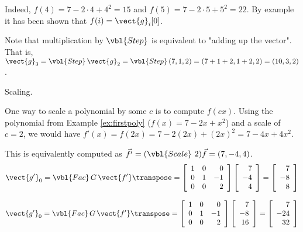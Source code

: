 Indeed, $f(4) = 7 - 2\cdot 4 + 4^2 = 15$ and $f(5) = 7 - 2\cdot 5 + 5^2 = 22$.
By example it has been shown that $f(i) = \vect{g}_i [0]$.

Note that multiplication by $\vbl{Step}$ is equivalent to "adding up the vector".
That is, $\vect{g}_3 = \vbl{Step}\,\vect{g}_2 = \vbl{Step}\,(7, 1, 2) = (7+1+2, 1+2, 2) = (10, 3, 2)$.

\begin{example}
 Scaling.
\end{example}

One way to scale a polynomial by some $c$ is to compute $f(cx)$.
Using the polynomial from Example \ref{ex:firstpoly} ($f(x)= 7 - 2x + x^2$) and a scale of $c=2$, we would have $f'(x) = f(2x) = 7 - 2 (2x) + (2x)^2 = 7 - 4x + 4x^2$.

This is equivalently computed as $\vec{f'} = (\vbl{Scale}\ 2) \vec{f} = (7, -4, 4)$.
\[
 \vect{g'}_0 =
 \vbl{Fac}\,G\,\vect{f'} \transpose =
 \left[\begin{array}{rrr}
   1 & 0 &  0 \\
   0 & 1 & -1 \\
   0 & 0 &  2 \\
 \end{array}\right]
 \left[\begin{array}{r}
   7 \\ -4 \\ 4 \\
 \end{array}\right]
 =
 \left[\begin{array}{r}
   7 \\ -8 \\ 8 \\
 \end{array}\right]
\]

\[
 \vect{g'}_0 =
 \vbl{Fac}\,G\,\vect{f'} \transpose =
 \left[\begin{array}{rrr}
   1 & 0 &  0 \\
   0 & 1 & -1 \\
   0 & 0 &  2 \\
 \end{array}\right]
 \left[\begin{array}{r}
   7 \\ -8 \\ 16 \\
 \end{array}\right]
 =
 \left[\begin{array}{r}
   7 \\ -24 \\ 32 \\
 \end{array}\right]
\]

